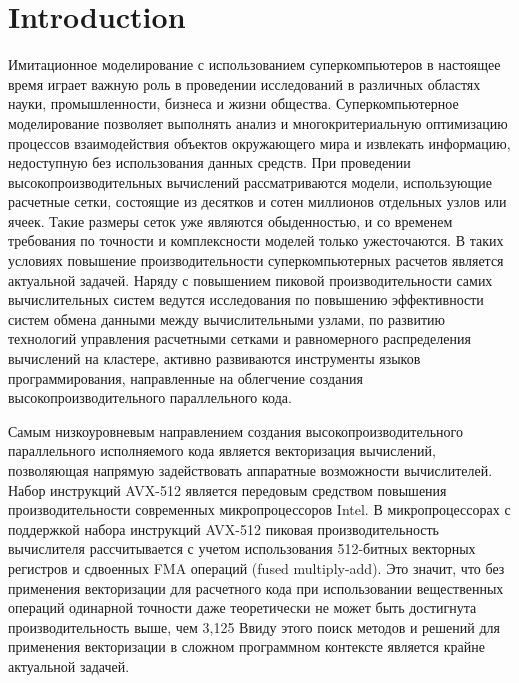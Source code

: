 \documentclass[
11pt,%
tightenlines,%
twoside,%
onecolumn,%
nofloats,%
nobibnotes,%
nofootinbib,%
superscriptaddress,%
noshowpacs,%
centertags]%
{revtex4}
\begin{document}


\maketitle

\section{Introduction}

Имитационное моделирование с использованием суперкомпьютеров в настоящее время играет важную роль в проведении исследований в различных областях науки, промышленности, бизнеса и жизни общества.
Суперкомпьютерное моделирование позволяет выполнять анализ и многокритериальную оптимизацию процессов взаимодействия объектов окружающего мира и извлекать информацию, недоступную без использования данных средств.
При проведении высокопроизводительных вычислений рассматриваются модели, использующие расчетные сетки, состоящие из десятков и сотен миллионов отдельных узлов или ячеек.
Такие размеры сеток уже являются обыденностью, и со временем требования по точности и комплексности моделей только ужесточаются.
В таких условиях повышение производительности суперкомпьютерных расчетов является актуальной задачей.
Наряду с повышением пиковой производительности самих вычислительных систем ведутся исследования по повышению эффективности систем обмена данными между вычислительными узлами, по развитию технологий управления расчетными сетками и равномерного распределения вычислений на кластере, активно развиваются инструменты языков программирования, направленные на облегчение создания высокопроизводительного параллельного кода.

Самым низкоуровневым направлением создания высокопроизводительного параллельного исполняемого кода является векторизация вычислений, позволяющая напрямую задействовать аппаратные возможности вычислителей.
Набор инструкций AVX-512 является передовым средством повышения производительности современных микропроцессоров Intel.
В микропроцессорах с поддержкой набора инструкций AVX-512 пиковая производительность вычислителя рассчитывается с учетом использования 512-битных векторных регистров и сдвоенных FMA операций (fused multiply-add).
Это значит, что без применения векторизации для расчетного кода при использовании вещественных операций одинарной точности даже теоретически не может быть достигнута производительность выше, чем 3,125%
Ввиду этого поиск методов и решений для применения векторизации в сложном программном контексте является крайне актуальной задачей.
\end{document}
